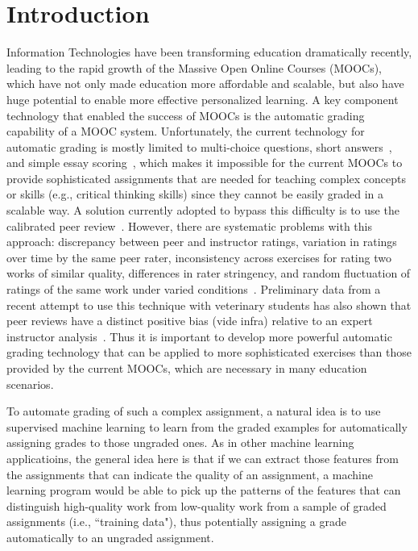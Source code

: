 \section{Introduction}

Information Technologies have been transforming education dramatically
recently, leading to the rapid growth of the Massive Open Online Courses
(MOOCs), which have not only made education more affordable and scalable,
but also have huge potential to enable more effective personalized
learning.  A key component technology that enabled the success of MOOCs is
the automatic grading capability of a MOOC system. Unfortunately, the
current technology for automatic grading is mostly limited to multi-choice
questions, short answers~\cite{Brooks:2014:Powergrading,
Leacock:2003:CatH, Mitchell:2002:ICAA, Pulman:2005:EdAppsNLP,
Mohler:2009:ACL}, and simple essay scoring~\cite{Chen:2014:IRRODL,
Balfour:2013}, which makes it impossible for the current MOOCs to provide
sophisticated assignments that are needed for teaching complex concepts or
skills (e.g., critical thinking skills) since they cannot be easily graded
in a scalable way. A solution currently adopted to bypass this difficulty
is to use the calibrated peer review~\cite{Balfour:2013, Chen:2014:IRRODL,
Sandeen:2013, Suen:2014}.  However, there are systematic problems with this
approach: discrepancy between peer and instructor ratings, variation in
ratings over time by the same peer rater, inconsistency across exercises
for rating two works of similar quality, differences in rater stringency,
and random fluctuation of ratings of the same work under varied
conditions~\cite{Suen:2014}. 
Preliminary data from a recent attempt to use this technique with
veterinary students has also shown that peer reviews have a distinct
positive bias (vide infra) relative to an expert instructor
analysis~\cite{Ferguson:2014}.
 Thus it is important to develop more
powerful automatic grading technology that can be applied to more
sophisticated exercises than those provided by the current MOOCs, which are
necessary in many education scenarios.



To automate grading of such a complex assignment, a natural idea is to
use supervised machine learning to learn from the graded examples for
automatically assigning grades to those ungraded ones. As in other machine learning
applicatioins, the general idea here is that if we can extract those features from the assignments that can indicate
the quality of an assignment, a machine learning program would be able to pick up
the patterns of the features that can distinguish high-quality work from low-quality work from a sample of graded assignments (i.e., ``training data"),  
thus potentially assigning a grade automatically to an ungraded assignment.  


